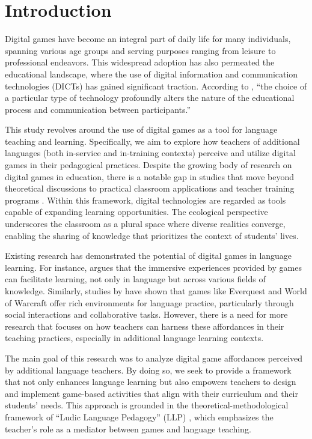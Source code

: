 \documentclass[english]{textolivre}
\begin{document}
\section{Introduction}\label{sec-intro}
Digital games have become an integral part of daily life for many individuals, spanning various age groups and serving purposes ranging from leisure to professional endeavors. This widespread adoption has also permeated the educational landscape, where the use of digital information and communication technologies (DICTs) has gained significant traction. According to \textcite[p. 45]{kenski2007educacao}, “the choice of a particular type of technology profoundly alters the nature of the educational process and communication between participants.”

This study revolves around the use of digital games as a tool for language teaching and learning. Specifically, we aim to explore how teachers of additional languages (both in-service and in-training contexts) perceive and utilize digital games in their pedagogical practices. Despite the growing body of research on digital games in education, there is a notable gap in studies that move beyond theoretical discussions to practical classroom applications and teacher training programs \cite{york2021playing}. Within this framework, digital technologies are regarded as tools capable of expanding learning opportunities. The ecological perspective \cite{gibson1986ecological,vanlier2000input,vanlier2004ecology,vanlier2010ecology} underscores the classroom as a plural space where diverse realities converge, enabling the sharing of knowledge that prioritizes the context of students’ lives.

Existing research has demonstrated the potential of digital games in language learning. For instance, \textcite{gee2003videogames} argues that the immersive experiences provided by games can facilitate learning, not only in language but across various fields of knowledge. Similarly, studies by \textcite{rankin2006rpg,rama2012wow} have shown that games like Everquest and World of Warcraft offer rich environments for language practice, particularly through social interactions and collaborative tasks. However, there is a need for more research that focuses on how teachers can harness these affordances in their teaching practices, especially in additional language learning contexts.

The main goal of this research was to analyze digital game affordances perceived by additional language teachers. By doing so, we seek to provide a framework that not only enhances language learning but also empowers teachers to design and implement game-based activities that align with their curriculum and their students’ needs. This approach is grounded in the theoretical-methodological framework of “Ludic Language Pedagogy” (LLP) \cite{york2021playing}, which emphasizes the teacher’s role as a mediator between games and language teaching.
\end{document}
